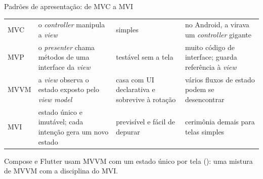 \begin{frame}{Padrões de apresentação: de MVC a MVI}
  \centering
  \raggedright
  \scriptsize
  \begin{tabularx}{\textwidth}{@{}l L L L@{}}
    \toprule
     &  &  &  \\
    \midrule
    MVC & o \emph{controller} manipula a \emph{view} & simples & no Android, a  virava um \emph{controller} gigante \\
    MVP & o \emph{presenter} chama métodos de uma interface da \emph{view} & testável sem a tela & muito código de interface; guarda referência à \emph{view} \\
    MVVM & a \emph{view} observa o estado exposto pelo \emph{view model} & casa com UI declarativa e sobrevive à rotação & vários fluxos de estado podem se desencontrar \\
    MVI & estado único e imutável; cada intenção gera um novo estado & previsível e fácil de depurar & cerimônia demais para telas simples \\
    \bottomrule
  \end{tabularx}
  \normalsize
  \begin{conceito}
    Compose e Flutter usam MVVM com um estado único por tela (): uma mistura de MVVM com a disciplina do MVI.
  \end{conceito}
\end{frame}

